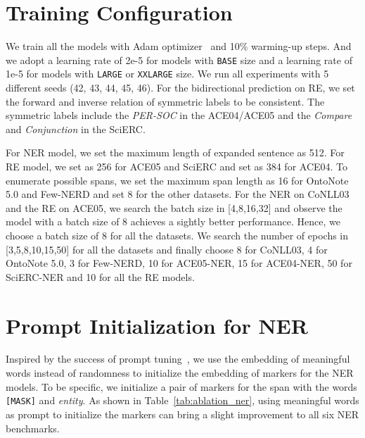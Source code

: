 \documentclass[11pt]{article}
\begin{document}



\appendix
\newpage
\section{Training Configuration}







We train all the models with Adam optimizer~\cite{Adam} and 10\% warming-up steps. And we adopt a learning rate of 2e-5 for  models with \texttt{BASE} size and a learning rate of 1e-5 for models with \texttt{LARGE} or \texttt{XXLARGE} size.  We run all experiments with 5 different seeds (42, 43, 44, 45, 46).   
For the bidirectional prediction on RE, we set the forward and inverse relation of symmetric labels to be consistent.  The symmetric labels include  the \emph{PER-SOC}   in the ACE04/ACE05  and  the \emph{Compare} and \emph{Conjunction}  in the SciERC. 

For NER model, we set the maximum length of expanded sentence  as 512.  For RE model, we set  as 256 for ACE05 and SciERC and set   as 384 for ACE04. To enumerate possible spans, we set the maximum span length   as 16 for OntoNote 5.0 and Few-NERD and set 8 for the other datasets. 
For the NER on CoNLL03 and the RE on ACE05, we search the batch size in [4,8,16,32] and observe the model with a batch size of 8  achieves a sightly better performance. Hence, we choose a batch size of 8 for all the datasets. We search the number of epochs in [3,5,8,10,15,50] for all the datasets and finally choose  8 for CoNLL03, 4  for OntoNote 5.0, 3 for Few-NERD, 10 for ACE05-NER, 15 for ACE04-NER, 50 for SciERC-NER and 10 for all the RE models.






\section{Prompt Initialization for NER}

Inspired by the success of {prompt} tuning~\cite{GPT3,PET},  we use the embedding of meaningful words instead of randomness to initialize the embedding of markers for the NER models. To be specific, we initialize a pair of markers for the span with the words \texttt{[MASK]} and \emph{entity}.  As shown in  Table~\ref{tab:ablation_ner},  using meaningful words as prompt to initialize the markers can bring a slight improvement to all six NER benchmarks.
\end{document}
